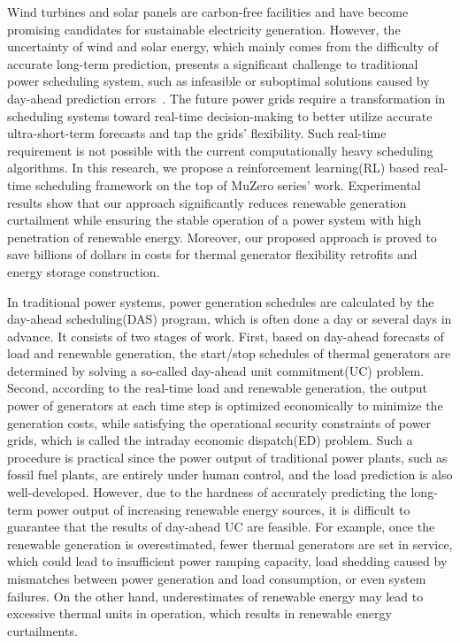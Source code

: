 Wind turbines and solar panels are carbon-free facilities and have become promising candidates for sustainable electricity generation. 
However, the uncertainty of wind and solar energy, which mainly comes from the difficulty of accurate long-term prediction, presents a significant challenge to traditional power scheduling system, such as infeasible or suboptimal solutions caused by day-ahead prediction errors~\cite{jabr2014robust}. The future power grids require a transformation in scheduling systems toward real-time decision-making to better utilize accurate ultra-short-term forecasts and tap the grids' flexibility. Such real-time requirement is not possible with the current computationally heavy scheduling algorithms.
In this research, we propose a reinforcement learning(RL) based real-time scheduling framework on the top of MuZero series' work.
Experimental results show that our approach significantly reduces renewable generation curtailment while ensuring the stable operation of a power system with high penetration of renewable energy. Moreover, our proposed approach is proved to save billions of dollars in costs for thermal generator flexibility retrofits and energy storage construction.

  
In traditional power systems, power generation schedules are calculated by the day-ahead scheduling(DAS) program, which is often done a day or several days in advance. It consists of two stages of work. First, based on day-ahead forecasts of load and renewable generation, the start/stop schedules of thermal generators are determined by solving a so-called day-ahead unit commitment(UC) problem. Second, according to the real-time load and renewable generation, the output power of generators at each time step is optimized economically to minimize the generation costs, while satisfying the operational security constraints of power grids, which is called the intraday economic dispatch(ED) problem.
Such a procedure is practical since the power output of traditional power plants, such as fossil fuel plants, are entirely under human control, and the load prediction is also well-developed. However, due to the hardness of accurately predicting the long-term power output of increasing renewable energy sources, it is difficult to guarantee that the results of day-ahead UC are feasible.
For example, once the renewable generation is overestimated, fewer thermal generators are set in service, which could lead to insufficient power ramping capacity, load shedding caused by mismatches between power generation and load consumption, or even system failures. 
On the other hand, underestimates of renewable energy may lead to excessive thermal units in operation, which results in renewable energy curtailments.




